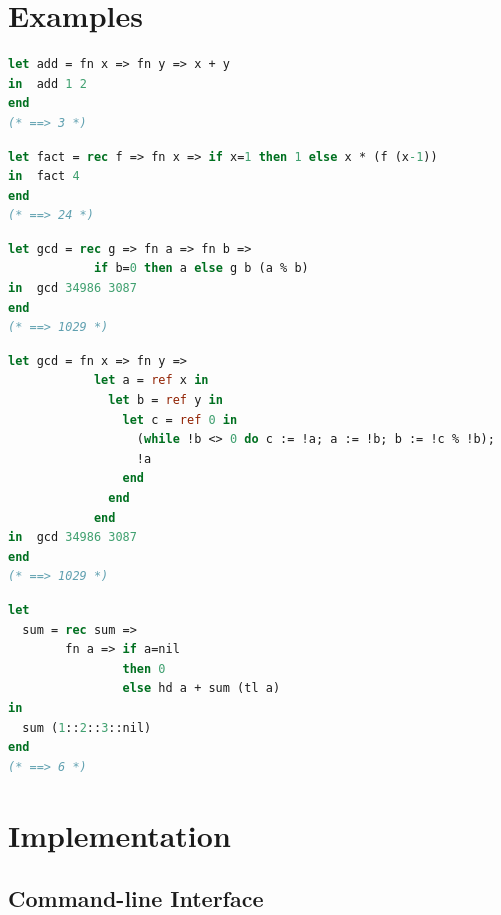 \documentclass{article}
\begin{document}
\section{Examples}

\begin{lstlisting}[language=ML]
let add = fn x => fn y => x + y
in  add 1 2
end
(* ==> 3 *)
\end{lstlisting}

\begin{lstlisting}[language=ML]
let fact = rec f => fn x => if x=1 then 1 else x * (f (x-1))
in  fact 4
end
(* ==> 24 *)
\end{lstlisting}

\begin{lstlisting}[language=ML]
let gcd = rec g => fn a => fn b =>
            if b=0 then a else g b (a % b)
in  gcd 34986 3087
end
(* ==> 1029 *)
\end{lstlisting}

\begin{lstlisting}[language=ML]
let gcd = fn x => fn y =>
            let a = ref x in
              let b = ref y in
                let c = ref 0 in
                  (while !b <> 0 do c := !a; a := !b; b := !c % !b);
                  !a
                end
              end
            end
in  gcd 34986 3087
end
(* ==> 1029 *)
\end{lstlisting}

\begin{lstlisting}[language=ML]
let
  sum = rec sum =>
  		fn a => if a=nil
                then 0
                else hd a + sum (tl a)
in
  sum (1::2::3::nil)
end
(* ==> 6 *)
\end{lstlisting}

\section{Implementation}

\subsection{Command-line Interface}
\end{document}
